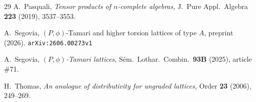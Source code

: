 \documentclass[12pt,reqno]{amsart}
\numberwithin{equation}{section}
\theoremstyle{definition}
\theoremstyle{theorem}
\theoremstyle{definition}
\begin{document}
\begin{thebibliography}{29}
  A.\ Pasquali, {\it Tensor products of $n$-complete algebras,} J.\ Pure Appl.\ Algebra {\bf 223} (2019), 3537--3553.

%
%

%



  A.\ Segovia, $( P,\phi )$-Tamari and higher torsion lattices of type $A$, preprint (2026).  {\tt arXiv:2606.00273v1}

  A.\ Segovia, {\it $( P,\phi )$-Tamari lattices,} S\'{e}m.\ Lothar.\ Combin.\ {\bf 93B} (2025), article \#71.

%

  H.\ Thomas, {\it An analogue of distributivity for ungraded lattices,} Order {\bf 23} (2006), 249--269.




\end{thebibliography}
\end{document}
